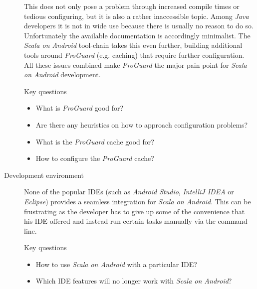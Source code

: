 \begin{description}
	This does not only pose a problem through increased compile times or tedious configuring, but it is also a rather inaccessible topic. Among \textit{Java} developers it is not in wide use because there is usually no reason to do so. Unfortunately the available documentation is accordingly minimalist. The \textit{Scala on Android} tool-chain takes this even further, building additional tools around \textit{ProGuard} (e.g. caching) that require further configuration. All these issues combined make \textit{ProGuard} the major pain point for \textit{Scala on Android} development.

	\begin{highlight}{Key questions}

		\begin{itemize}

			\item What is \textit{ProGuard} good for?

			\item Are there any heuristics on how to approach configuration problems?

			\item What is the \textit{ProGuard} cache good for?

			\item How to configure the \textit{ProGuard} cache?

		\end{itemize}

	\end{highlight}

	\item[Development environment]\hfill

	None of the popular \acp{IDE} (such as \textit{Android Studio}, \textit{IntelliJ IDEA} or \textit{Eclipse}) provides a seamless integration for \textit{Scala on Android}. This can be frustrating as the developer has to give up some of the convenience that his \ac{IDE} offered and instead run certain tasks manually via the command line.

	\begin{highlight}{Key questions}

		\begin{itemize}

			\item How to use \textit{Scala on Android} with a particular \ac{IDE}?

			\item Which \ac{IDE} features will no longer work with \textit{Scala on Android}?


\end{itemize}
\end{highlight}
\end{description}
